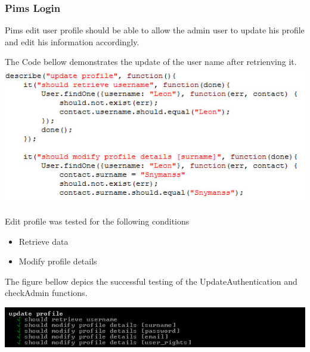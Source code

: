  \subsubsection{Pims Login}
Pims edit user profile should be able to allow the admin user to update his profile and edit his information accordingly.
\newline

The Code bellow demonstrates the update of the user name after retrienving it.
\newline
\includegraphics[width=\linewidth]{./TestingDoc/Graphics/editCode.jpg}
\newline
		
Edit profile was  tested for the following conditions					
	\begin{itemize}
				\item Retrieve data
				\item Modify profile details
 \end{itemize}
 

 The figure bellow depics the successful testing of the UpdateAuthentication and checkAdmin functions.
 \newline
 
 \includegraphics[width=\linewidth]{./TestingDoc/Graphics/editProfile.jpg}

 
